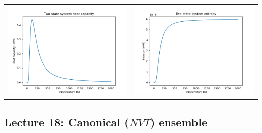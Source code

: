 \documentclass[11pt]{article}
\begin{document}
\begin{table}
\begin{tabular}{cc}
\includegraphics[scale=0.5]{Images/2state-heatcapacity.png} & \includegraphics[scale=0.5]{Images/2state-entropy.png}
\end{tabular}
\end{table}
\subsection{Lecture 18: Canonical (\(NVT\)) ensemble}
\label{sec:orgfd55da9}
\end{document}
